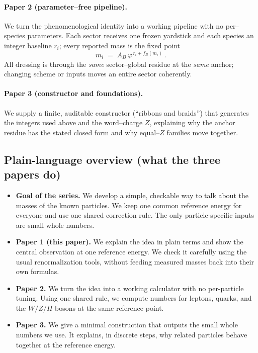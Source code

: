 \documentclass[epjc3]{svjour3}
\begin{document}
\paragraph{Paper 2 (parameter--free pipeline).}
We turn the phenomenological identity into a working pipeline with no per--species parameters. Each sector receives one frozen yardstick and each species an integer baseline $r_i$; every reported mass is the fixed point
\[
  m_i \;=\; A_B\,\varphi^{\,r_i + f_B(m_i)}\,.
\]
All dressing is through the \emph{same} sector--global residue at the \emph{same} anchor; changing scheme or inputs moves an entire sector coherently.

\paragraph{Paper 3 (constructor and foundations).}
We supply a finite, auditable constructor (``ribbons and braids'') that generates the integers used above and the word--charge $Z$, explaining why the anchor residue has the stated closed form and why equal--$Z$ families move together.

\subsection*{Plain-language overview (what the three papers do)}
\begin{itemize}
  \item \textbf{Goal of the series.} We develop a simple, checkable way to talk about the masses of the known particles. We keep one common reference energy for everyone and use one shared correction rule. The only particle-specific inputs are small whole numbers.
  \item \textbf{Paper 1 (this paper).} We explain the idea in plain terms and show the central observation at one reference energy. We check it carefully using the usual renormalization tools, without feeding measured masses back into their own formulas.
  \item \textbf{Paper 2.} We turn the idea into a working calculator with no per-particle tuning. Using one shared rule, we compute numbers for leptons, quarks, and the $W/Z/H$ bosons at the same reference point.
  \item \textbf{Paper 3.} We give a minimal construction that outputs the small whole numbers we use. It explains, in discrete steps, why related particles behave together at the reference energy.
\end{itemize}
\end{document}
